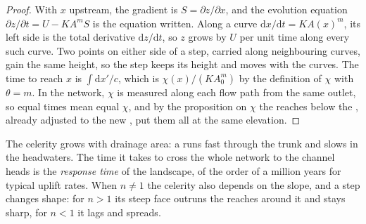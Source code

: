 \begin{proof}
With $x$ upstream, the gradient is $S = \partial z/\partial x$, and the
evolution equation $\partial z/\partial t = U - K A^m S$ is the equation
written. Along a curve $\mathrm{d}x/\mathrm{d}t = K A(x)^m$, its left side
is the total derivative $\mathrm{d}z/\mathrm{d}t$, so $z$ grows by $U$ per
unit time along every such curve. Two points on either side of a step,
carried along neighbouring curves, gain the same height, so the step keeps
its height and moves with the curves. The time to reach $x$ is
$\int \mathrm{d}x'/c$, which is $\chi(x)/(K A_0^m)$ by the definition of
$\chi$ with $\theta = m$. In the network, $\chi$ is measured along each
flow path from the same outlet, so equal times mean equal $\chi$, and by
the proposition on $\chi$ the reaches below the , already
adjusted to the new , put them all at the same elevation.
\end{proof}

The celerity grows with drainage area: a  runs fast through the
trunk and slows in the headwaters. The time it takes to cross the whole
network to the channel heads is the \emph{response time} of the landscape,
of the order of a million years for typical uplift rates. When $n \ne 1$
the celerity also depends on the slope, and a step changes shape: for $n >
1$ its steep face outruns the reaches around it and stays sharp, for $n <
1$ it lags and spreads.

